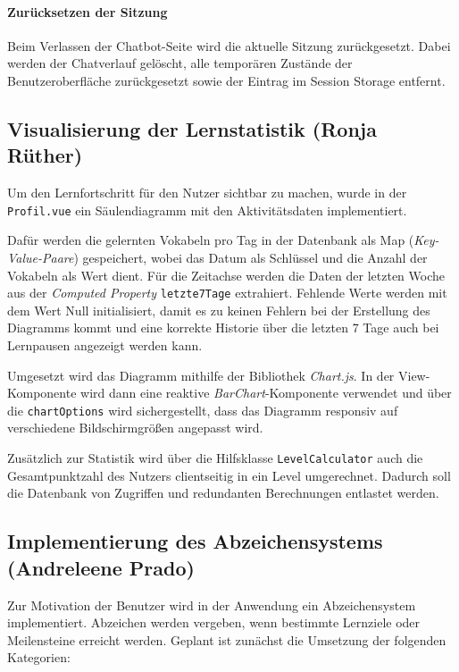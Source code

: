 \paragraph{Zurücksetzen der Sitzung}

Beim Verlassen der Chatbot-Seite wird die aktuelle Sitzung zurückgesetzt. 
Dabei werden der Chatverlauf gelöscht, alle temporären Zustände der Benutzeroberfläche zurückgesetzt sowie der Eintrag im Session Storage entfernt.

\subsection{Visualisierung der Lernstatistik (Ronja Rüther)}
Um den Lernfortschritt für den Nutzer sichtbar zu machen, wurde in der \texttt{Profil.vue} ein Säulendiagramm mit den Aktivitätsdaten implementiert.

Dafür werden die gelernten Vokabeln pro Tag in der Datenbank als Map (\textit{Key-Value-Paare}) gespeichert, wobei das Datum als Schlüssel und die Anzahl der Vokabeln als Wert dient.
Für die Zeitachse werden die Daten der letzten Woche aus der \textit{Computed Property} \texttt{letzte7Tage} extrahiert. Fehlende Werte werden mit dem Wert Null initialisiert, damit es 
zu keinen Fehlern bei der Erstellung des Diagramms kommt und eine korrekte Historie über die letzten 7 Tage auch bei Lernpausen angezeigt werden kann.

Umgesetzt wird das Diagramm mithilfe der Bibliothek \textit{Chart.js}. In der View-Komponente wird dann eine reaktive \textit{BarChart}-Komponente verwendet und über die 
\texttt{chartOptions} wird sichergestellt, dass das Diagramm responsiv auf verschiedene Bildschirmgrößen angepasst wird.

Zusätzlich zur Statistik wird über die Hilfsklasse \texttt{LevelCalculator} auch die Gesamtpunktzahl des Nutzers clientseitig in ein Level umgerechnet. Dadurch soll die Datenbank von Zugriffen und redundanten Berechnungen entlastet werden. 

\subsection{Implementierung des Abzeichensystems (Andreleene Prado)}

Zur Motivation der Benutzer wird in der Anwendung ein Abzeichensystem implementiert. 
Abzeichen werden vergeben, wenn bestimmte Lernziele oder Meilensteine erreicht werden. 
Geplant ist zunächst die Umsetzung der folgenden Kategorien:

